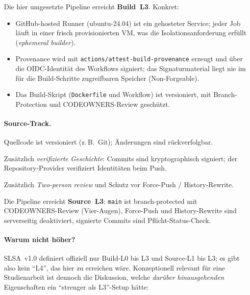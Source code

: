 \documentclass[12pt, a4paper]{scrartcl}
\begin{document}
Die hier umgesetzte Pipeline erreicht \textbf{Build~L3}. Konkret:

\begin{itemize}[leftmargin=1.4em]
  \item GitHub-hosted Runner (ubuntu-24.04) ist ein gehosteter Service;
        jeder Job läuft in einer frisch provisionierten VM, was die
        Isolation\-sanforderung erfüllt (\emph{ephemeral builder}).
  \item Provenance wird mit \texttt{actions/attest-build-provenance}
        erzeugt und über die OIDC-Identität des Workflows signiert; das
        Signaturmaterial liegt nie im für die Build-Schritte
        zugreifbaren Speicher (Non-Forgeable).
  \item Das Build-Skript (\texttt{Dockerfile} und Workflow) ist
        versioniert, mit Branch-Protection und CODEOWNERS-Review
        geschützt.
\end{itemize}

\paragraph{Source-Track.}
\begin{description}[leftmargin=1.4em,style=nextline]
  \item[L1] Quellcode ist versioniert (z.\,B.\ Git); Änderungen sind
        rückverfolgbar.
  \item[L2] Zusätzlich \emph{verifizierte Geschichte}: Commits sind
        kryptographisch signiert; der Repository-Provider verifiziert
        Identitäten beim Push.
  \item[L3] Zusätzlich \emph{Two-person review} und Schutz vor
        Force-Push / History-Rewrite.
\end{description}

Die Pipeline erreicht \textbf{Source~L3}: \texttt{main} ist
branch-protected mit CODEOWNERS-Review (Vier-Augen), Force-Push und
History-Rewrite sind serverseitig deaktiviert, signierte Commits sind
Pflicht-Status-Check.

\paragraph{Warum nicht höher?}
SLSA~v1.0 definiert offiziell nur Build-L0 bis L3 und Source-L1 bis
L3; es gibt also kein \enquote{L4}, das hier zu erreichen wäre.
Konzeptionell relevant für eine Studienarbeit ist dennoch die
Diskussion, welche \emph{darüber hinausgehenden} Eigenschaften ein
\enquote{strenger als L3}-Setup hätte:
\end{document}
